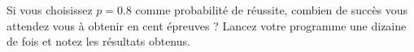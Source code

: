 
\begin{exercice}\label{exoPremiere-0081}

    Si vous choisissez \( p=0.8\) comme probabilité de réussite, combien de succès vous attendez vous à obtenir en cent épreuves ? Lancez votre programme une dizaine de fois et notez les résultats obtenus.

\end{exercice}
